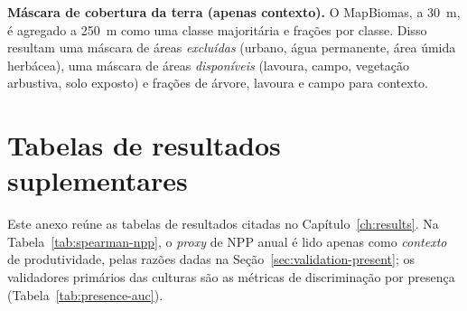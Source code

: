 \textbf{Máscara de cobertura da terra (apenas contexto).} O MapBiomas, a 30~m, é
agregado a 250~m como uma classe majoritária e frações por classe. Disso resultam uma máscara de
áreas \emph{excluídas} (urbano, água permanente, área úmida herbácea), uma máscara de áreas
\emph{disponíveis} (lavoura, campo, vegetação arbustiva, solo exposto) e frações de
árvore, lavoura e campo para contexto.

\chapter{Tabelas de resultados suplementares}\label{anx:tables}

Este anexo reúne as tabelas de resultados citadas no Capítulo~\ref{ch:results}. Na
Tabela~\ref{tab:spearman-npp}, o \emph{proxy} de NPP anual é lido apenas como \emph{contexto} de
produtividade, pelas razões dadas na Seção~\ref{sec:validation-present}; os validadores primários das
culturas são as métricas de discriminação por presença (Tabela~\ref{tab:presence-auc}).

\begin{table}[htbp]
\centering
\caption{Médias biofísicas discriminantes por zona.}
\label{tab:zone-means}

\end{table}

\begin{table}[htbp]
\centering
\caption{Mudança média projetada, $\Delta S$, por zona para as três culturas sensíveis ao clima,
nas quatro combinações de cenário e janela.}
\label{tab:zone-shift}

\end{table}

\begin{table}[htbp]
\centering
\caption{Parcela da terra avaliada de cada segmento rebaixada em pelo menos uma classe da
FAO, presente $\rightarrow$ futuro (as promoções, desprezíveis, foram omitidas).}
\label{tab:downgrade-share}
\small

\end{table}

\begin{table}[htbp]
\centering
\caption{Matriz de transição de classes da FAO, presente $\rightarrow$ futuro, para as
outras culturas anuais sob SSP5-8.5, 2051--2070 (área como percentual da terra avaliada do
segmento).}
\label{tab:transition-othercrops}

\end{table}

